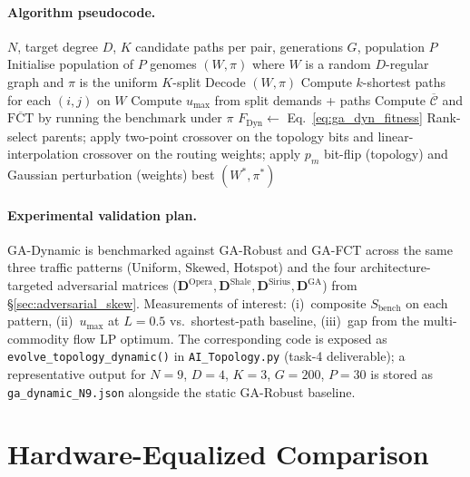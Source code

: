 \documentclass{article}
\begin{document}
    \paragraph{Algorithm pseudocode.}
    \begin{algorithmic}[1]
        \Require $N$, target degree $D$, $K$ candidate paths per pair, generations $G$, population $P$
        \State Initialise population of $P$ genomes $(W, \pi)$ where $W$ is a random $D$-regular graph and $\pi$ is the uniform $K$-split
                \State Decode $(W, \pi)$
                \State Compute $k$-shortest paths for each $(i,j)$ on $W$
                \State Compute $u_{\max}$ from split demands + paths
                \State Compute $\overline{\mathcal{C}}$ and $\overline{\mathrm{FCT}}$ by running the benchmark under $\pi$
                \State $F_{\text{Dyn}} \gets$ Eq.~\ref{eq:ga_dyn_fitness}
            \EndFor
            \State Rank-select parents; apply two-point crossover on the topology bits and linear-interpolation crossover on the routing weights; apply $p_m$ bit-flip (topology) and Gaussian perturbation (weights)
        \EndFor
        \State \Return best $(W^*, \pi^*)$
    \end{algorithmic}

    \paragraph{Experimental validation plan.}
    \label{sec:ga_dynamic_bench}
    GA-Dynamic is benchmarked against GA-Robust and GA-FCT across the same three traffic patterns (Uniform, Skewed, Hotspot) and the four architecture-targeted adversarial matrices ($\mathbf{D}^{\text{Opera}}, \mathbf{D}^{\text{Shale}}, \mathbf{D}^{\text{Sirius}}, \mathbf{D}^{\text{GA}}$) from \S\ref{sec:adversarial_skew}.  Measurements of interest: (i)~composite $S_{\text{bench}}$ on each pattern, (ii)~$u_{\max}$ at $L=0.5$ vs.\ shortest-path baseline, (iii)~gap from the multi-commodity flow LP optimum.  The corresponding code is exposed as \texttt{evolve\_topology\_dynamic()} in \texttt{AI\_Topology.py} (task-4 deliverable); a representative output for $N=9$, $D=4$, $K=3$, $G=200$, $P=30$ is stored as \texttt{ga\_dynamic\_N9.json} alongside the static GA-Robust baseline.

    \section{Hardware-Equalized Comparison}
    \label{sec:hw_comparison}
\end{document}
